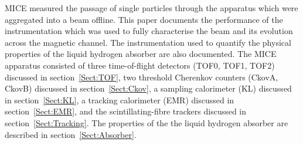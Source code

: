 MICE measured the passage of single particles through the apparatus which were aggregated into
a beam offline.
This paper documents the performance of the instrumentation which was
used to fully characterise the beam and its evolution across the magnetic
channel.
The instrumentation used to quantify the physical properties of the liquid hydrogen absorber are also documented.
The MICE apparatus consisted of three time-of-flight detectors
(TOF0, TOF1, TOF2) discussed in section~\ref{Sect:TOF}, two 
threshold Cherenkov counters (CkovA, CkovB) discussed in
section~\ref{Sect:Ckov}, a sampling calorimeter (KL) discussed in
section~\ref{Sect:KL}, a tracking calorimeter (EMR) discussed in
section~\ref{Sect:EMR}, and the scintillating-fibre trackers discussed in section~\ref{Sect:Tracking}.
The properties of the the liquid hydrogen
absorber are described in section~\ref{Sect:Absorber}.
